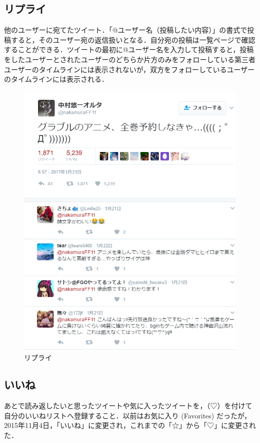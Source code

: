 \subsection{リプライ}
他のユーザーに宛てたツイート．「@ユーザー名（投稿したい内容）」の書式で投稿すると，そのユーザー宛の返信扱いとなる．自分宛の投稿は一覧ページで確認することができる．ツイートの最初に@ユーザー名を入力して投稿すると，投稿をしたユーザーとされたユーザーのどちらか片方のみをフォローしている第三者ユーザーのタイムラインには表示されないが，双方をフォローしているユーザーのタイムラインには表示される．

\begin{figure}[htb]
\centering
\includegraphics[width=15cm]{reply.png}
\caption{リプライ}\label{reply}
\end{figure}
\clearpage
\subsection{いいね}
あとで読み返したいと思ったツイートや気に入ったツイートを，（♡）を付けて自分のいいねリストへ登録すること．以前はお気に入り (Favorites) だったが，2015年11月4日，「いいね」に変更され，これまでの「☆」から「♡」に変更された．

